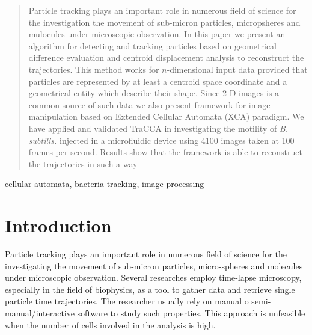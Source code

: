 \documentclass[conference]{IEEEtran}
\begin{document}
\maketitle


\begin{abstract}
Particle tracking plays an important role in numerous field of science for the investigation the movement of sub-micron particles, micropsheres and mulocules under microscopic observation. In this paper we present an algorithm for detecting and tracking particles based on geometrical difference evaluation and centroid displacement analysis to reconstruct the trajectories. 
This method works for $n$-dimensional input data provided that particles are represented by at least a centroid space coordinate and a geometrical entity which describe their shape. 
Since 2-D images is a common source of such data we also present framework for image-manipulation based on Extended Cellular Automata (XCA) paradigm.
We have applied and validated TraCCA in investigating the motility of \textit{B. subtilis.} injected in a microfluidic device using 4100 images taken at 100 frames per second. 
Results show that the framework is able to reconstruct the trajectories in such a way 


\end{abstract}

\begin{IEEEkeywords}
cellular automata, bacteria tracking, image processing
\end{IEEEkeywords}






%
\IEEEpeerreviewmaketitle

\section{Introduction}
Particle tracking plays an important role in numerous field of science for the investigating the movement of sub-micron particles, micro-spheres and molecules under microscopic observation.  Several researches employ time-lapse microscopy, especially in the field of biophysics, as a tool to gather data and retrieve single particle time trajectories. The researcher usually rely on manual o semi-manual/interactive software to study such properties. This approach is unfeasible when the number of cells involved in the analysis is high.
\end{document}
